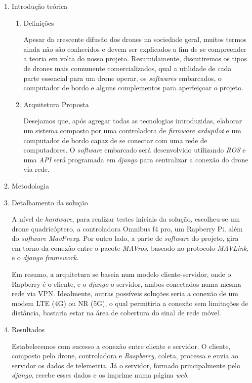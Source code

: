 \documentclass[12pt,a4paper,oneside]{book}
\begin{document}
\begin{enumerate}
     \item Introdução teórica 
     
     \begin{enumerate}
     
         \item Definições
         
         Apesar da crescente difusão dos drones na sociedade geral, muitos termos ainda não são conhecidos e devem ser explicados a fim de se compreender a teoria em volta do nosso projeto. Resumidamente, discutiremos os tipos de drones mais comumente comercializados, qual a utilidade de cada parte essencial para um drone operar,  os \textit{softwares} embarcados, o computador de bordo e alguns complementos para aperfeiçoar o projeto.
         
         \item Arquitetura Proposta
 
         Desejamos que, após agregar todas as tecnologias introduzidas, elaborar um sistema composto por uma controladora de \textit{firmware ardupilot} e um computador de bordo capaz de se conectar com uma rede de computadores. O \textit{software} embarcado será desenvolvido utilizando \textit{ROS} e uma \textit{API} será programada em \textit{django} para centralizar a conexão do drone via rede.
 
     \end{enumerate}
     
     \item Metodologia
 
     \item Detalhamento da solução \label{item:solucao}
     
     A nível de \textit{hardware}, para realizar testes iniciais da 
     solução, escolheu-se um drone quadricóptero, a controladora 
     Omnibus f4 pro, um Rapberry Pi, além do \textit{software MavProxy}. 
     Por outro lado, a parte de \textit{software} do projeto, gira em torno
     da conexão entre o pacote \textit{MAVros}, baseado no protocolo 
     \textit{MAVLink}, e o \textit{django framework}.
     
     Em resumo, a
     arquitetura se baseia num modelo cliente-servidor, onde o Rapberry
     é o cliente, e o \textit{django} o servidor, ambos conectados numa mesma
     rede via VPN. Idealmente, outras possíveis soluções seria a conexão de
     um modem LTE (4G) ou NR (5G), o qual permitiria a conexão sem limitações de 
     distância, bastaria estar na área de cobertura do sinal de rede móvel.

     \item Resultados
     
     Estabelecemos com sucesso a conexão entre cliente e servidor. O cliente, composto
     pelo drone, controladora e \textit{Raspberry}, coleta, processa e envia ao servidor os
     dados de telemetria. Já o servidor, formado principalmente pelo \textit{django},
     recebe esses dados e os imprime numa página \textit{web}.



\end{enumerate}
\end{document}
